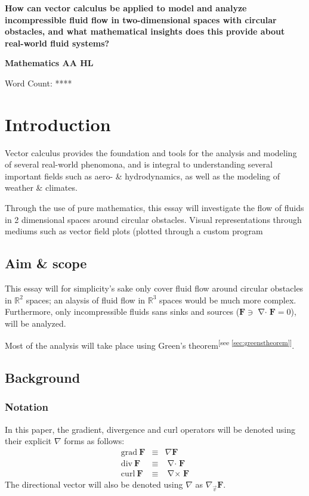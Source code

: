 \documentclass[a4paper,12pt]{article}
\newcommand{\fatf}{\mathbf{F}}         		%
\DeclareMathOperator{\divergence}{\nabla\cdot}
\DeclareMathOperator{\curl}{\nabla\times}
\newcommand{\referto}[1]{\textsuperscript{\color{darkgray}\tiny[see \ref{#1}]}}
\newcommand{\researchquestion}
{
	How can vector calculus be applied to model and analyze 
	incompressible fluid flow in two-dimensional spaces with 
	circular obstacles, and what mathematical insights
	does this provide about real-world fluid systems?
}
\begin{document}
\begin{titlepage}
	\begin{center}
		\vspace*{0.5cm}
		\Large\textbf{\researchquestion}

		\vspace{1.5cm}
		\large\textbf{Mathematics AA HL}

		\vfill
		\color{darkgray} Word Count: ****
	\end{center}
\end{titlepage}

\tableofcontents\newpage

\section{Introduction}
Vector calculus provides the foundation and tools for the analysis and modeling of several real-world phenomona, and is integral to understanding several important fields such as aero- \& hydrodynamics, as well as the modeling of weather \& climates. 

Through the use of pure mathematics, this essay will investigate the flow of fluids in 2 dimensional spaces around circular obstacles. Visual representations through mediums such as vector field plots (plotted through a custom program
\subsection{Aim \& scope}
This essay will for simplicity's sake only cover fluid flow around circular obstacles in $\mathbb{R}^2$ spaces; an alaysis of fluid flow in $\mathbb{R}^3$ spaces would be much more complex.
Furthermore, only incompressible fluids sans sinks and sources ($\fatf\ni\divergence\fatf=0$), will be analyzed.

Most of the analysis will take place using Green's theorem\referto{sec:greenstheorem}.

\subsection{Background}
\subsubsection{Notation}
In this paper, the gradient, divergence and curl operators will be denoted using their explicit $\nabla$ forms as follows:
$$\begin{matrix}
	\mathrm{grad}\ \fatf&\equiv&\nabla\fatf\\
	\mathrm{div}\ \fatf&\equiv&\divergence\fatf\\
	\mathrm{curl}\ \fatf&\equiv&\curl\fatf
\end{matrix}$$
The directional vector will also be denoted using $\nabla$ as $\nabla_{\vec{v}}\fatf$.
\end{document}
